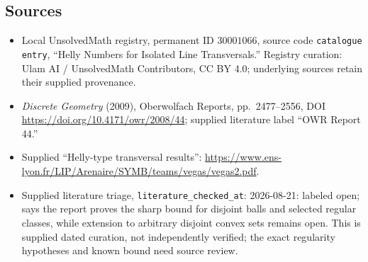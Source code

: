 \documentclass[11pt]{article}
\begin{document}
\subsection{Sources}
\begin{itemize}
\item Local UnsolvedMath registry, permanent ID \(30001066\), source code \texttt{catalogue entry}, ``Helly Numbers for Isolated Line Transversals.'' Registry curation: Ulam AI / UnsolvedMath Contributors, CC BY 4.0; underlying sources retain their supplied provenance.
\item \emph{Discrete Geometry} (2009), Oberwolfach Reports, pp.\ 2477--2556, DOI \url{https://doi.org/10.4171/owr/2008/44}; supplied literature label ``OWR Report 44.''
\item Supplied ``Helly-type transversal results'': \url{https://www.ens-lyon.fr/LIP/Arenaire/SYMB/teams/vegas/vegas2.pdf}.
\item Supplied literature triage, \texttt{literature\_checked\_at}: 2026-08-21: labeled open; says the report proves the sharp bound for disjoint balls and selected regular classes, while extension to arbitrary disjoint convex sets remains open. This is supplied dated curation, not independently verified; the exact regularity hypotheses and known bound need source review.
\end{itemize}
\end{document}
